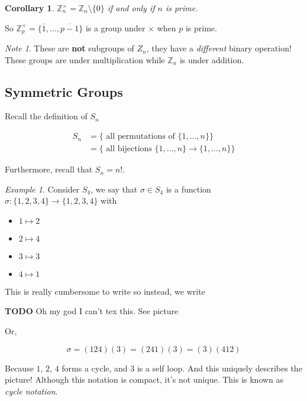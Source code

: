 \documentclass[12pt]{article}
\def\Z{{\mathbb Z}}
\def\TODO{\color{red}\textbf{TODO}\color{black}}
\newtheorem{corollary}{Corollary}
\theoremstyle{remark}
\theoremstyle{remark}
\theoremstyle{remark}
\newtheorem{example}{Example}
\theoremstyle{remark}
\theoremstyle{remark}
\newtheorem*{note}{Note}
\begin{document}
\begin{corollary}
  $\Z_n^\times = \Z_n \setminus \{0\}$ if and only if $n$ is prime.
\end{corollary}

So $\Z_p^\times = \{\bar 1, \dots, \overline{p - 1} \}$ is a group under $\times$
when $p$ is prime.

\begin{note}
  These are {\bf not} subgroups of $Z_n$, they have a {\it different} binary
  operation! These groups are under multiplication while $\Z_n$ is under
  addition.
\end{note}

\subsection{Symmetric Groups}

Recall the definition of $S_n$

\begin{align*}
  S_n &= \{\text{ all permutations of } \{1, \dots, n\}\} \\
      &= \{\text{ all bijections } \{1, \dots, n\} \to \{1, \dots, n\} \}
\end{align*}

Furthermore, recall that $S_n = n!$.

\begin{example}
  Consider $S_4$, we say that $\sigma \in S_4$ is a function $\sigma: \{1, 2, 3,
  4\} \to \{1, 2, 3, 4\}$ with

  \begin{itemize}
    \item $1 \mapsto 2$
    \item $2 \mapsto 4$
    \item $3 \mapsto 3$
    \item $4 \mapsto 1$
  \end{itemize}
\end{example}

This is really cumbersome to write so instead, we write

\TODO{} Oh my god I can't tex this. See picture

Or,

\[
  \sigma = (124)(3) = (241)(3) = (3)(412)
\]

Because $1$, $2$, $4$ forms a cycle, and $3$ is a self loop. And this uniquely
describes the picture! Although this notation is compact, it's not unique.
This is known as {\it cycle notation}.
\end{document}
